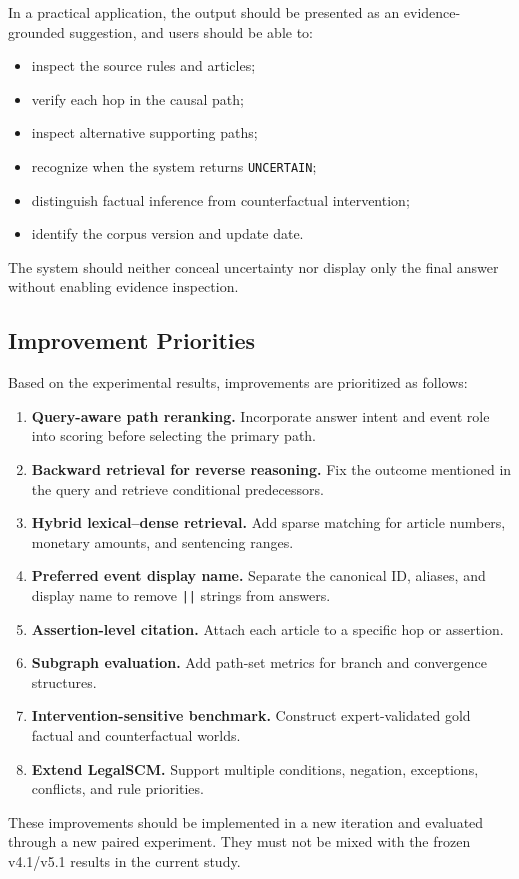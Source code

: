 In a practical application, the output should be presented as an
evidence-grounded suggestion, and users should be able to:

\begin{itemize}
    \item inspect the source rules and articles;
    \item verify each hop in the causal path;
    \item inspect alternative supporting paths;
    \item recognize when the system returns \texttt{UNCERTAIN};
    \item distinguish factual inference from counterfactual intervention;
    \item identify the corpus version and update date.
\end{itemize}

The system should neither conceal uncertainty nor display only the final
answer without enabling evidence inspection.

\subsection{Improvement Priorities}

Based on the experimental results, improvements are prioritized as follows:

\begin{enumerate}
    \item \textbf{Query-aware path reranking.}
    Incorporate answer intent and event role into scoring before selecting
    the primary path.

    \item \textbf{Backward retrieval for reverse reasoning.}
    Fix the outcome mentioned in the query and retrieve conditional
    predecessors.

    \item \textbf{Hybrid lexical--dense retrieval.}
    Add sparse matching for article numbers, monetary amounts, and
    sentencing ranges.

    \item \textbf{Preferred event display name.}
    Separate the canonical ID, aliases, and display name to remove
    \texttt{||} strings from answers.

    \item \textbf{Assertion-level citation.}
    Attach each article to a specific hop or assertion.

    \item \textbf{Subgraph evaluation.}
    Add path-set metrics for branch and convergence structures.

    \item \textbf{Intervention-sensitive benchmark.}
    Construct expert-validated gold factual and counterfactual worlds.

    \item \textbf{Extend LegalSCM.}
    Support multiple conditions, negation, exceptions, conflicts, and rule
    priorities.
\end{enumerate}

These improvements should be implemented in a new iteration and evaluated
through a new paired experiment. They must not be mixed with the frozen
v4.1/v5.1 results in the current study.
